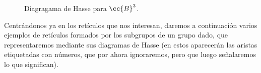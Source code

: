 \begin{ejemplo}
\begin{enumerate}
\begin{figure}[H]
                \caption{Diagragama de Hasse para $\cc{B}^3$.}
            \end{figure}
    \end{enumerate}
\end{ejemplo}

Centrándonos ya en los retículos que nos interesan, daremos a continuación varios ejemplos de retículos formados por los subgrupos de un grupo dado, que representaremos mediante sus diagramas de Hasse (en estos aparecerán las aristas etiquetadas con números, que por ahora ignoraremos, pero que luego señalaremos lo que significan).

